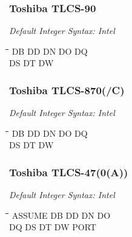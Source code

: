 \subsubsection{Toshiba TLCS-90}

{\em Default Integer Syntax: Intel}

{\tt\begin{tabbing}
\hspace{3cm}\=\hspace{3cm}\=\hspace{3cm}\=\hspace{3cm}\=\kill
DB         \> DD          \> DN         \> DO          \> DQ \\
DS         \> DT          \> DW \\
\end{tabbing}}

\subsubsection{Toshiba TLCS-870(/C)}

{\em Default Integer Syntax: Intel}

{\tt\begin{tabbing}
\hspace{3cm}\=\hspace{3cm}\=\hspace{3cm}\=\hspace{3cm}\=\kill
DB         \> DD          \> DN         \> DO          \> DQ \\
DS         \> DT          \> DW \\
\end{tabbing}}

\subsubsection{Toshiba TLCS-47(0(A))}

{\em Default Integer Syntax: Intel}

{\tt\begin{tabbing}
\hspace{3cm}\=\hspace{3cm}\=\hspace{3cm}\=\hspace{3cm}\=\kill
ASSUME     \> DB          \> DD         \> DN          \> DO \\
DQ         \> DS          \> DT         \> DW          \> PORT \\
\end{tabbing}}

